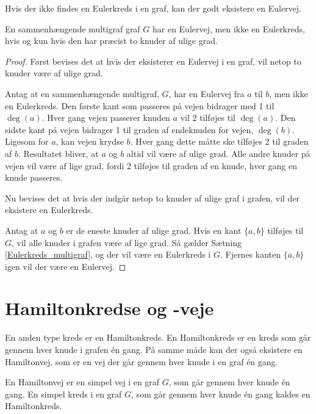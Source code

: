 Hvis der ikke findes en Eulerkreds i en graf, kan der godt eksistere en Eulervej. 

\begin{thm} \label{Eulervej_multigraf}
	En sammenhængende multigraf graf $G$ har en Eulervej, men ikke en Eulerkreds, hvis og kun hvis den har præcist to knuder af ulige grad.  
\end{thm} 

\begin{proof}
	Først bevises det at hvis der eksisterer en Eulervej i en graf, vil netop to knuder være af ulige grad. 

	Antag at en sammenhængende multigraf, $G$, har en Eulervej fra $a$ til $b$, men ikke en Eulerkreds. 
	Den første kant som passeres på vejen bidrager med 1 til $\deg(a)$. 
	Hver gang vejen passerer knuden $a$ vil 2 tilføjes til $\deg(a)$. 
	Den sidste kant på vejen bidrager 1 til graden af endeknuden for vejen, $\deg(b)$. 
	Ligesom for $a$, kan vejen krydse $b$. 
	Hver gang dette måtte ske tilføjes 2 til graden af $b$. 
	Resultatet bliver, at $a$ og $b$ altid vil være af ulige grad. 
	Alle andre knuder på vejen vil være af lige grad, fordi 2 tilføjes til graden af en knude, hver gang en knude passeres.  
	
	Nu bevises det at hvis der indgår netop to knuder af ulige graf i grafen, vil der eksistere en Eulerkreds.

	Antag at $a$ og $b$ er de eneste knuder af ulige grad. 
	Hvis en kant $\lbrace a,b \rbrace$ tilføjes til $G$, vil alle knuder i grafen være af lige grad. 
	Så gælder Sætning \ref{Eulerkreds_multigraf}, og der vil være en Eulerkreds i $G$. 
	Fjernes kanten $\lbrace a,b \rbrace$ igen vil der være en Eulervej. 
\end{proof}

\section{Hamiltonkredse og -veje}
En anden type kreds er en Hamiltonkreds. 
En Hamiltonkreds er en kreds som går gennem hver knude i grafen én gang. På samme måde kan der også eksistere en Hamiltonvej, som er en vej der går gennem hver knude i en graf én gang. 

\begin{defn} \label{hamiltion_defn}
	En Hamiltonvej er en simpel vej i en graf $G$, som går gennem hver knude én gang.
	En simpel kreds i en graf $G$, som går gennem hver knude én gang kaldes en Hamiltonkreds.
\end{defn}

